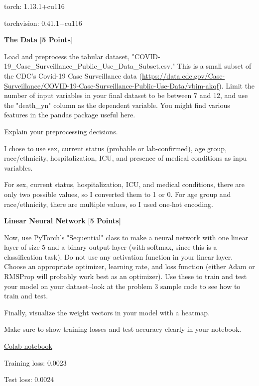 \begin{solution}

  torch: 1.13.1+cu116

  torchvision: 0.41.1+cu116
\end{solution}

\problem \textbf{The Data} \textbf{[5 Points]}

Load and preprocess the tabular dataset, "COVID-19\_Case\_Surveillance\_Public\_Use\_Data\_Subset.csv." This is a small subset of the CDC's Covid-19 Case Surveillance data (\url{https://data.cdc.gov/Case-Surveillance/COVID-19-Case-Surveillance-Public-Use-Data/vbim-akqf}). Limit the number of input variables in your final dataset to be between 7 and 12, and use the "death\_yn" column as the dependent variable. You might find various features in the pandas package useful here.

Explain your preprocessing decisions.

\begin{solution}
  I chose to use sex, current status (probable or lab-confirmed), age group, race/ethnicity, hospitalization, ICU, and presence of medical conditions as inpu variables.

  For sex, current status, hospitalization, ICU, and medical conditions, there are only two possible values, so I converted them to 1 or 0.
  For age group and race/ethnicity, there are multiple values, so I used one-hot encoding.
\end{solution}


\problem \textbf{Linear Neural Network} \textbf{[5 Points]}

Now, use PyTorch's "Sequential" class to make a neural network with one linear layer of size 5 and a binary output layer (with softmax, since this is a classification task). Do not use any activation function in your linear layer. Choose an appropriate optimizer, learning rate, and loss function (either Adam or RMSProp will probably work best as an optimizer). Use these to train and test your model on your dataset--look at the problem 3 sample code to see how to train and test.

Finally, visualize the weight vectors in your model with a heatmap.

Make sure to show training losses and test accuracy clearly in your notebook.

\begin{solution}
  \href{https://colab.research.google.com/drive/1CEy1H7IvghgXV2q81M6ysFEpoctXcrl4?usp=sharing}{Colab notebook}

  Training loss: 0.0023

  Test loss: 0.0024
\end{solution}


